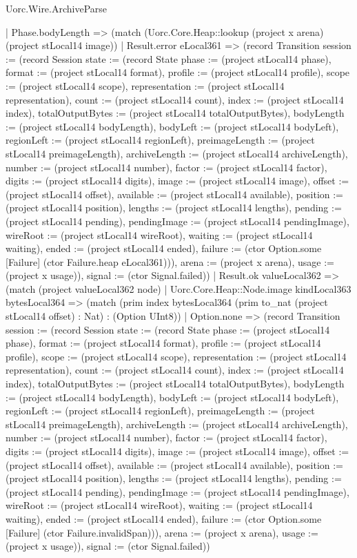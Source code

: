 \begin{lexlean}{Uorc.Wire.ArchiveParse}
\begin{semanticmodule}
{        | Phase.bodyLength => (match (Uorc.Core.Heap::lookup (project x arena) (project stLocal14 image))
          | Result.error eLocal361 => (record Transition {session := (record Session {state := (record State {phase := (project stLocal14 phase), format := (project stLocal14 format), profile := (project stLocal14 profile), scope := (project stLocal14 scope), representation := (project stLocal14 representation), count := (project stLocal14 count), index := (project stLocal14 index), totalOutputBytes := (project stLocal14 totalOutputBytes), bodyLength := (project stLocal14 bodyLength), bodyLeft := (project stLocal14 bodyLeft), regionLeft := (project stLocal14 regionLeft), preimageLength := (project stLocal14 preimageLength), archiveLength := (project stLocal14 archiveLength), number := (project stLocal14 number), factor := (project stLocal14 factor), digits := (project stLocal14 digits), image := (project stLocal14 image), offset := (project stLocal14 offset), available := (project stLocal14 available), position := (project stLocal14 position), lengths := (project stLocal14 lengths), pending := (project stLocal14 pending), pendingImage := (project stLocal14 pendingImage), wireRoot := (project stLocal14 wireRoot), waiting := (project stLocal14 waiting), ended := (project stLocal14 ended), failure := (ctor Option.some [Failure] (ctor Failure.heap eLocal361))}), arena := (project x arena), usage := (project x usage)}), signal := (ctor Signal.failed)})
          | Result.ok valueLocal362 => (match (project valueLocal362 node)
            | Uorc.Core.Heap::Node.image kindLocal363 bytesLocal364 => (match (prim index bytesLocal364 (prim to_nat (project stLocal14 offset) : Nat) : (Option UInt8))
              | Option.none => (record Transition {session := (record Session {state := (record State {phase := (project stLocal14 phase), format := (project stLocal14 format), profile := (project stLocal14 profile), scope := (project stLocal14 scope), representation := (project stLocal14 representation), count := (project stLocal14 count), index := (project stLocal14 index), totalOutputBytes := (project stLocal14 totalOutputBytes), bodyLength := (project stLocal14 bodyLength), bodyLeft := (project stLocal14 bodyLeft), regionLeft := (project stLocal14 regionLeft), preimageLength := (project stLocal14 preimageLength), archiveLength := (project stLocal14 archiveLength), number := (project stLocal14 number), factor := (project stLocal14 factor), digits := (project stLocal14 digits), image := (project stLocal14 image), offset := (project stLocal14 offset), available := (project stLocal14 available), position := (project stLocal14 position), lengths := (project stLocal14 lengths), pending := (project stLocal14 pending), pendingImage := (project stLocal14 pendingImage), wireRoot := (project stLocal14 wireRoot), waiting := (project stLocal14 waiting), ended := (project stLocal14 ended), failure := (ctor Option.some [Failure] (ctor Failure.invalidSpan))}), arena := (project x arena), usage := (project x usage)}), signal := (ctor Signal.failed)})
}
\end{semanticmodule}
\end{lexlean}
